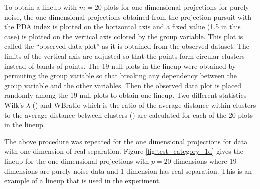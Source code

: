 \documentclass[12]{article}
\begin{document}
To obtain a lineup with $m = 20$ plots for one dimensional projections for purely noise, the one dimensional projections obtained from the projection pursuit with the PDA index is plotted on the horizontal axis and a fixed value (1.5 in this case) is plotted on the vertical axis colored by the group variable. This plot is called the ``observed data plot'' as it is obtained from the observed dataset. The limits of the vertical axis are adjusted so that the points form circular clusters instead of bands of points. The 19 null plots in the lineup were obtained by  permuting the group variable so that breaking any dependency between the group variable and the other variables. Then the observed data plot is placed randomly among the 19 null plots to obtain one lineup. Two different statistics Wilk's $\lambda$ (\cite{JW02}) and WBratio which is the ratio of the average distance within clusters to the average distance between clusters (\cite{hennig:2010}) are calculated for each of the 20 plots in the lineup. 

The above procedure was repeated for the one dimensional projections for data with one dimension of real separation. Figure \ref{fig:test_category_1d} gives the lineup  for the one dimensional projections with $p = 20$ dimensions where 19 dimensions are purely noise data and 1 dimension has real separation. This is an example of a lineup that is used in the experiment. 

\end{document}
